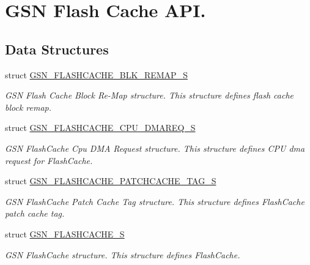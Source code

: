 \hypertarget{a00646}{
\section{GSN Flash Cache API.}
\label{a00646}
}
\subsection*{Data Structures}
\begin{DoxyCompactItemize}
\item 
struct \hyperlink{a00074}{GSN\_\-FLASHCACHE\_\-BLK\_\-REMAP\_\-S}
\begin{DoxyCompactList}\small\item\em GSN Flash Cache Block Re-\/Map structure. This structure defines flash cache block remap. \end{DoxyCompactList}\item 
struct \hyperlink{a00075}{GSN\_\-FLASHCACHE\_\-CPU\_\-DMAREQ\_\-S}
\begin{DoxyCompactList}\small\item\em GSN FlashCache Cpu DMA Request structure. This structure defines CPU dma request for FlashCache. \end{DoxyCompactList}\item 
struct \hyperlink{a00076}{GSN\_\-FLASHCACHE\_\-PATCHCACHE\_\-TAG\_\-S}
\begin{DoxyCompactList}\small\item\em GSN FlashCache Patch Cache Tag structure. This structure defines FlashCache patch cache tag. \end{DoxyCompactList}\item 
struct \hyperlink{a00077}{GSN\_\-FLASHCACHE\_\-S}
\begin{DoxyCompactList}\small\item\em GSN FlashCache structure. This structure defines FlashCache. \end{DoxyCompactList}\end{DoxyCompactItemize}

